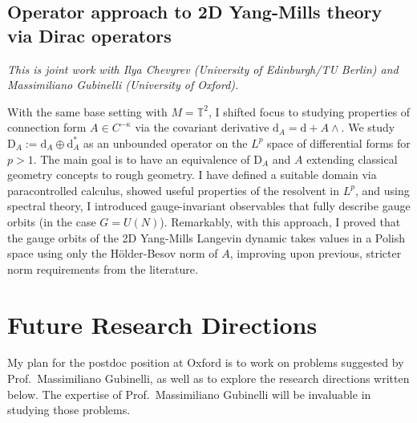 \documentclass[12pt]{article}
\numberwithin{equation}{section}
\theoremstyle{definition}
\theoremstyle{remark}
\newcommand{\diff}{\mathrm{d}}
\newcommand{\1}{\mathbf 1}
\newcommand{\<}{\langle}
\renewcommand{\>}{\rangle}
\newcommand{\rmD}{\mathrm{D}}
\newcommand{\T}{\mathbb T}
\begin{document}
\subsection{Operator approach to 2D Yang-Mills theory via Dirac operators}\label{sec:Dirac_2D}
%
\textit{This is joint work with Ilya Chevyrev (University of Edinburgh/TU Berlin) and Massimiliano Gubinelli (University of Oxford).} 

\medskip 

\noindent With the same base setting with $M=\T^2$, I shifted focus to studying properties of connection form $A\in C^{-\kappa}$ via the covariant derivative $\diff_A = \diff + A\wedge $. We study $\rmD_A:=\diff_A\oplus\diff_A^*$ as an unbounded operator on the $L^p$  space of differential forms for $p>1$.  The main goal is to have an equivalence of $\rmD_A$ and $A$ extending classical geometry concepts to rough geometry. I have defined a suitable domain via paracontrolled calculus, showed useful properties of the resolvent in $L^p$, and using spectral theory, I introduced gauge-invariant observables that fully describe gauge orbits (in the case $G=U(N)$). Remarkably, with this approach, I proved that the gauge orbits of the 2D Yang-Mills Langevin dynamic takes values in a Polish space using only the H\"older-Besov norm of $A$, improving upon previous, stricter norm requirements from the literature. 

 

\section{Future Research Directions}\label{sec:future}
My plan for the postdoc position at Oxford is to work on problems suggested by Prof.\ Massimiliano Gubinelli, as well as to explore the research directions written below. The expertise of Prof.\ Massimiliano Gubinelli will be invaluable in studying those problems.




\end{document}
